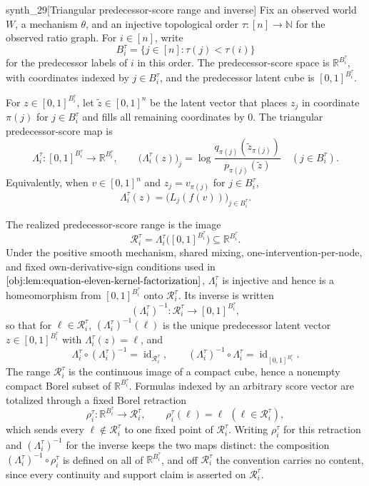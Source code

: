 \begin{definitionv}{synth_29}[Triangular predecessor-score range and inverse]
Fix an observed world \(W\), a mechanism \(\theta\), and an injective topological order \(\tau:[n]\to\mathbb N\) for the observed ratio graph. For \(i\in[n]\), write
\[
B_i^\tau=\{j\in[n]:\tau(j)<\tau(i)\}
\]
for the predecessor labels of \(i\) in this order. The predecessor-score space is \(\mathbb R^{B_i^\tau}\), with coordinates indexed by \(j\in B_i^\tau\), and the predecessor latent cube is \([0,1]^{B_i^\tau}\).

For \(z\in[0,1]^{B_i^\tau}\), let \(\tilde z\in[0,1]^n\) be the latent vector that places \(z_j\) in coordinate \(\pi(j)\) for \(j\in B_i^\tau\) and fills all remaining coordinates by \(0\). The triangular predecessor-score map is
\[
\Lambda_i^\tau:[0,1]^{B_i^\tau}\longrightarrow \mathbb R^{B_i^\tau},
\qquad
\bigl(\Lambda_i^\tau(z)\bigr)_j
=
\log\frac{q_{\pi(j)}(\tilde z_{\pi(j)})}{p_{\pi(j)}(\tilde z)}
\quad (j\in B_i^\tau).
\]
Equivalently, when \(v\in[0,1]^n\) and \(z_j=v_{\pi(j)}\) for \(j\in B_i^\tau\),
\[
\Lambda_i^\tau(z)
=
\bigl(L_j(f(v))\bigr)_{j\in B_i^\tau}.
\]

The realized predecessor-score range is the image
\[
\mathcal R_i^\tau=\Lambda_i^\tau\bigl([0,1]^{B_i^\tau}\bigr)\subseteq \mathbb R^{B_i^\tau}.
\]
Under the positive smooth mechanism, shared mixing, one-intervention-per-node, and fixed own-derivative-sign conditions used in \(\cref{obj:lem:equation-eleven-kernel-factorization}\), \(\Lambda_i^\tau\) is injective and hence is a homeomorphism from \([0,1]^{B_i^\tau}\) onto \(\mathcal R_i^\tau\). Its inverse is written
\[
(\Lambda_i^\tau)^{-1}:\mathcal R_i^\tau\longrightarrow[0,1]^{B_i^\tau},
\]
so that for \(\ell\in\mathcal R_i^\tau\), \((\Lambda_i^\tau)^{-1}(\ell)\) is the unique predecessor latent vector \(z\in[0,1]^{B_i^\tau}\) with \(\Lambda_i^\tau(z)=\ell\), and
\[
\Lambda_i^\tau\circ(\Lambda_i^\tau)^{-1}=\operatorname{id}_{\mathcal R_i^\tau},
\qquad
(\Lambda_i^\tau)^{-1}\circ\Lambda_i^\tau=\operatorname{id}_{[0,1]^{B_i^\tau}}.
\]
The range \(\mathcal R_i^\tau\) is the continuous image of a compact cube, hence a nonempty compact Borel subset of \(\mathbb R^{B_i^\tau}\). Formulas indexed by an arbitrary score vector are totalized through a fixed Borel retraction
\[
\rho_i^\tau:\mathbb R^{B_i^\tau}\longrightarrow\mathcal R_i^\tau,
\qquad
\rho_i^\tau(\ell)=\ell\ \ (\ell\in\mathcal R_i^\tau),
\]
which sends every \(\ell\notin\mathcal R_i^\tau\) to one fixed point of \(\mathcal R_i^\tau\). Writing \(\rho_i^\tau\) for this retraction and \((\Lambda_i^\tau)^{-1}\) for the inverse keeps the two maps distinct: the composition \((\Lambda_i^\tau)^{-1}\circ\rho_i^\tau\) is defined on all of \(\mathbb R^{B_i^\tau}\), and off \(\mathcal R_i^\tau\) the convention carries no content, since every continuity and support claim is asserted on \(\mathcal R_i^\tau\).
\end{definitionv}


